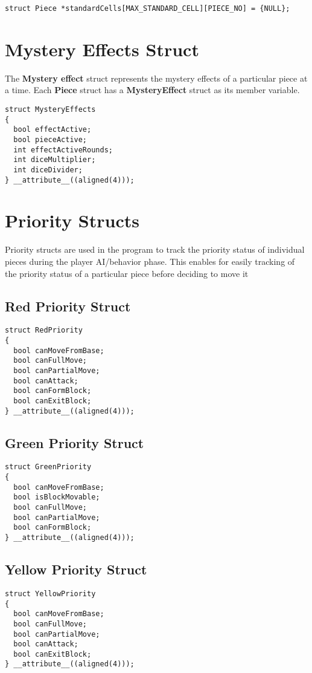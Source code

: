 \documentclass[12pt, a4paper]{report}
\begin{document}
\begin{lstlisting}
struct Piece *standardCells[MAX_STANDARD_CELL][PIECE_NO] = {NULL};
\end{lstlisting}

\section{Mystery Effects Struct}
The \textbf{Mystery effect} struct represents the mystery effects of a particular piece at a time. Each \textbf{Piece} struct has a \textbf{MysteryEffect} struct as its member variable.

\begin{lstlisting}
struct MysteryEffects
{
  bool effectActive;
  bool pieceActive;
  int effectActiveRounds;
  int diceMultiplier;
  int diceDivider;
} __attribute__((aligned(4)));
\end{lstlisting}

\section{Priority Structs}
Priority structs are used in the program to track the priority status of individual pieces during the player AI/behavior phase. This enables for easily tracking of the priority status of a particular piece before deciding to move it

\subsection{Red Priority Struct}
\begin{lstlisting}
struct RedPriority
{
  bool canMoveFromBase;
  bool canFullMove;
  bool canPartialMove;
  bool canAttack;
  bool canFormBlock;
  bool canExitBlock;
} __attribute__((aligned(4)));
\end{lstlisting}

\subsection{Green Priority Struct}
\begin{lstlisting}
struct GreenPriority
{
  bool canMoveFromBase;
  bool isBlockMovable;
  bool canFullMove;
  bool canPartialMove;
  bool canFormBlock;
} __attribute__((aligned(4)));
\end{lstlisting}

\subsection{Yellow Priority Struct}
\begin{lstlisting}
struct YellowPriority
{
  bool canMoveFromBase;
  bool canFullMove;
  bool canPartialMove;
  bool canAttack;
  bool canExitBlock;
} __attribute__((aligned(4)));
\end{lstlisting}
\end{document}
